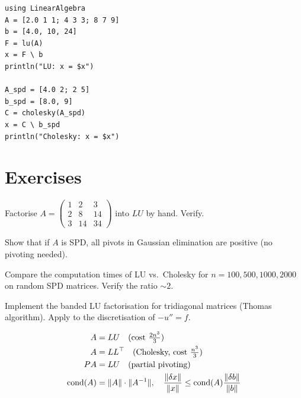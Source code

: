 \begin{codeblock}[title=\textbf{Julia}]
\begin{verbatim}
using LinearAlgebra
A = [2.0 1 1; 4 3 3; 8 7 9]
b = [4.0, 10, 24]
F = lu(A)
x = F \ b
println("LU: x = $x")

A_spd = [4.0 2; 2 5]
b_spd = [8.0, 9]
C = cholesky(A_spd)
x = C \ b_spd
println("Cholesky: x = $x")
\end{verbatim}
\end{codeblock}

\section{Exercises}

\begin{exercise}[$\star$]
Factorise $A=\begin{pmatrix}1&2&3\\2&8&14\\3&14&34\end{pmatrix}$ into $LU$ by hand. Verify.
\end{exercise}

\begin{exercise}[$\star\star$]
Show that if $A$ is SPD, all pivots in Gaussian elimination are positive (no pivoting needed).
\end{exercise}

\begin{exercise}[$\star\star$]
Compare the computation times of LU vs.\ Cholesky for $n=100,500,1000,2000$ on random SPD matrices. Verify the ratio $\sim 2$.
\end{exercise}

\begin{exercise}
Implement the banded LU factorisation for tridiagonal matrices (Thomas algorithm). Apply to the discretisation of $-u''=f$.
\end{exercise}

\begin{keyformulas}
\begin{align*}
A &= LU \quad (\text{cost } \tfrac{2n^3}{3}) \\
A &= LL^\top \quad (\text{Cholesky, cost } \tfrac{n^3}{3}) \\
PA &= LU \quad (\text{partial pivoting}) \\
\mathrm{cond}(A) &= \|A\|\cdot\|A^{-1}\|, \quad \frac{\|\delta x\|}{\|x\|}\leq\mathrm{cond}(A)\frac{\|\delta b\|}{\|b\|}
\end{align*}
\end{keyformulas}
